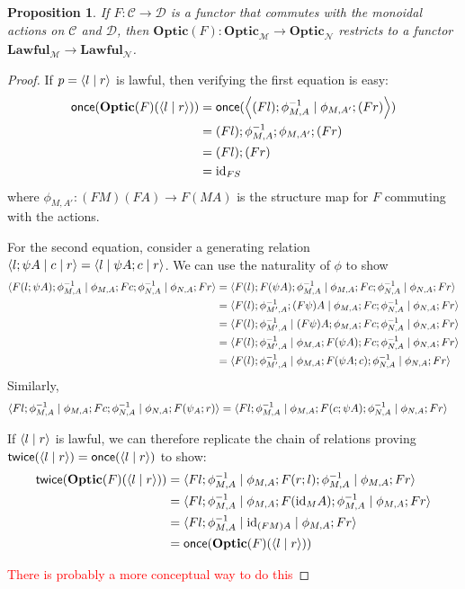 \documentclass[11pt,a4paper]{article}
\theoremstyle{plain}
\newtheorem{proposition}[theorem]{Proposition}
\theoremstyle{definition}
\newcommand{\C}{\mathscr{C}}
\newcommand{\D}{\mathscr{D}}
\newcommand{\M}{\mathscr{M}}
\newcommand{\N}{\mathscr{N}}
\newcommand{\Optic}{\mathbf{Optic}}
\newcommand{\Lawful}{\mathbf{Lawful}}
\newcommand{\id}{\mathrm{id}}
\newcommand{\rep}[2]{{\ensuremath \left\langle #1 \mid #2 \right\rangle}}
\newcommand{\repthree}[3]{{\ensuremath \langle #1 \mid #2 \mid #3 \rangle}}
\newcommand{\once}{\mathsf{once}}
\newcommand{\twice}{\mathsf{twice}}
\newcommand{\todo}[1]{\textcolor{red}{\small #1}}
\begin{document}
\begin{proposition}
  If $F : \C \to \D$ is a functor that commutes with the monoidal actions on $\C$ and $\D$, then $\Optic(F) : \Optic_\M \to \Optic_\N$ restricts to a functor $\Lawful_\M \to \Lawful_\N$.
\end{proposition}
\begin{proof}
  If $p = \rep{l}{r}$ is lawful, then verifying the first equation is easy:
  \begin{align*}
  \once(\Optic(F)(\rep{l}{r})) 
  &= \once(\rep{(Fl);\phi^{-1}_{M,A} }{\phi_{M,A'};(Fr) }) \\
  &= (Fl);\phi^{-1}_{M,A};\phi_{M,A'};(Fr)\\
  &= (Fl);(Fr)\\
  &= \id_{FS}
  \end{align*}
  where $\phi_{M,A'} : (FM)(FA) \to F(MA)$ is the structure map for $F$ commuting with the actions.
  
  For the second equation, consider a generating relation $\repthree{l;\psi A}{c}{r} = \repthree{l}{\psi A ; c}{r}$. We can use the naturality of $\phi$ to show
  \begin{align*}
  \repthree{F(l;\psi A);\phi^{-1}_{M,A}}{\phi_{M,A};Fc;\phi^{-1}_{N,A}}{\phi_{N,A};Fr} 
  &= \repthree{F(l);F(\psi A);\phi^{-1}_{M,A}}{\phi_{M,A};Fc;\phi^{-1}_{N,A}}{\phi_{N,A};Fr} \\
  &= \repthree{F(l);\phi^{-1}_{M',A};(F\psi) A}{\phi_{M,A};Fc;\phi^{-1}_{N,A}}{\phi_{N,A};Fr} \\
  &= \repthree{F(l);\phi^{-1}_{M',A}}{(F\psi) A;\phi_{M,A};Fc;\phi^{-1}_{N,A}}{\phi_{N,A};Fr} \\
  &= \repthree{F(l);\phi^{-1}_{M',A}}{\phi_{M,A};F(\psi A);Fc;\phi^{-1}_{N,A}}{\phi_{N,A};Fr} \\
  &= \repthree{F(l);\phi^{-1}_{M',A}}{\phi_{M,A};F(\psi A;c);\phi^{-1}_{N,A}}{\phi_{N,A};Fr} \\
  \end{align*}
  Similarly, 
  \begin{align*}
    \repthree{Fl;\phi^{-1}_{M,A}}{\phi_{M,A};Fc;\phi^{-1}_{N,A}}{\phi_{N,A};F(\psi_A;r)} 
    &= \repthree{Fl;\phi^{-1}_{M,A}}{\phi_{M,A};F(c;\psi A);\phi^{-1}_{N,A}}{\phi_{N,A};Fr} 
  \end{align*}

  If $\rep{l}{r}$ is lawful, we can therefore replicate the chain of relations proving $\twice(\rep{l}{r}) = \once(\rep{l}{r})$ to show:
  \begin{align*}
  \twice(\Optic(F)(\rep{l}{r})) 
  &= \repthree{Fl;\phi^{-1}_{M,A}}{\phi_{M,A};F(r;l);\phi^{-1}_{M,A}}{\phi_{M,A};Fr}  \\
  &= \repthree{Fl;\phi^{-1}_{M,A}}{\phi_{M,A};F(\id_MA);\phi^{-1}_{M,A}}{\phi_{M,A};Fr}  \\
  &= \repthree{Fl;\phi^{-1}_{M,A}}{\id_{(FM)A}}{\phi_{M,A};Fr}  \\
  &= \once(\Optic(F)(\rep{l}{r})) 
  \end{align*}
  
  \todo{There is probably a more conceptual way to do this}
\end{proof}
\end{document}

